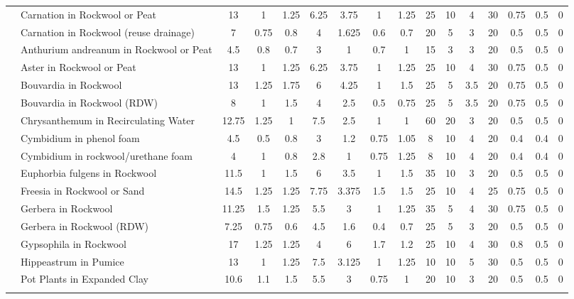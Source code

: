 \documentclass[
  letterpaper,
  DIV=11,
  numbers=noendperiod]{scrreprt}
\begin{document}
\begin{landscape}
\begin{longtable}[t]{llcccccccccccccc}
\nopagebreak
 & Carnation in Rockwool or Peat & 13 & 1 & 1.25 & 6.25 & 3.75 & 1 & 1.25 & 25 & 10 & 4 & 30 & 0.75 & 0.5 & 0\\
\nopagebreak
 & Carnation in Rockwool (reuse drainage) & 7 & 0.75 & 0.8 & 4 & 1.625 & 0.6 & 0.7 & 20 & 5 & 3 & 20 & 0.5 & 0.5 & 0\\
\nopagebreak
 & Anthurium andreanum in Rockwool or Peat & 4.5 & 0.8 & 0.7 & 3 & 1 & 0.7 & 1 & 15 & 3 & 3 & 20 & 0.5 & 0.5 & 0\\
\nopagebreak
 & Aster in Rockwool or Peat & 13 & 1 & 1.25 & 6.25 & 3.75 & 1 & 1.25 & 25 & 10 & 4 & 30 & 0.75 & 0.5 & 0\\
\nopagebreak
 & Bouvardia in Rockwool & 13 & 1.25 & 1.75 & 6 & 4.25 & 1 & 1.5 & 25 & 5 & 3.5 & 20 & 0.75 & 0.5 & 0\\
\nopagebreak
 & Bouvardia in Rockwool (RDW) & 8 & 1 & 1.5 & 4 & 2.5 & 0.5 & 0.75 & 25 & 5 & 3.5 & 20 & 0.75 & 0.5 & 0\\
\nopagebreak
 & Chrysanthemum in Recirculating Water & 12.75 & 1.25 & 1 & 7.5 & 2.5 & 1 & 1 & 60 & 20 & 3 & 20 & 0.5 & 0.5 & 0\\
\nopagebreak
 & Cymbidium in phenol foam & 4.5 & 0.5 & 0.8 & 3 & 1.2 & 0.75 & 1.05 & 8 & 10 & 4 & 20 & 0.4 & 0.4 & 0\\
\nopagebreak
 & Cymbidium in rockwool/urethane foam & 4 & 1 & 0.8 & 2.8 & 1 & 0.75 & 1.25 & 8 & 10 & 4 & 20 & 0.4 & 0.4 & 0\\
\nopagebreak
 & Euphorbia fulgens in Rockwool & 11.5 & 1 & 1.5 & 6 & 3.5 & 1 & 1.5 & 35 & 10 & 3 & 20 & 0.5 & 0.5 & 0\\
\nopagebreak
 & Freesia in Rockwool or Sand & 14.5 & 1.25 & 1.25 & 7.75 & 3.375 & 1.5 & 1.5 & 25 & 10 & 4 & 25 & 0.75 & 0.5 & 0\\
\nopagebreak
 & Gerbera in Rockwool & 11.25 & 1.5 & 1.25 & 5.5 & 3 & 1 & 1.25 & 35 & 5 & 4 & 30 & 0.75 & 0.5 & 0\\
\nopagebreak
 & Gerbera in Rockwool (RDW) & 7.25 & 0.75 & 0.6 & 4.5 & 1.6 & 0.4 & 0.7 & 25 & 5 & 3 & 20 & 0.5 & 0.5 & 0\\
\nopagebreak
 & Gypsophila in Rockwool & 17 & 1.25 & 1.25 & 4 & 6 & 1.7 & 1.2 & 25 & 10 & 4 & 30 & 0.8 & 0.5 & 0\\
\nopagebreak
 & Hippeastrum in Pumice & 13 & 1 & 1.25 & 7.5 & 3.125 & 1 & 1.25 & 10 & 10 & 5 & 30 & 0.5 & 0.5 & 0\\
\nopagebreak
 & Pot Plants in Expanded Clay & 10.6 & 1.1 & 1.5 & 5.5 & 3 & 0.75 & 1 & 20 & 10 & 3 & 20 & 0.5 & 0.5 & 0\\
\nopagebreak

\end{longtable}
\end{landscape}
\end{document}
